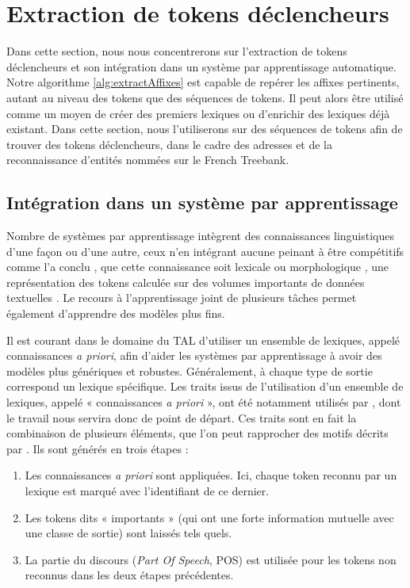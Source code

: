 \documentclass[12pt,a4paper,times,twoside,openright]{report}
\begin{document}
    
    \section{Extraction de tokens déclencheurs}
    \label{sec:keyword-extraction}
Dans cette section, nous nous concentrerons sur l'extraction de tokens déclencheurs et son intégration dans un système par apprentissage automatique. Notre algorithme \ref{alg:extractAffixes} est capable de repérer les affixes pertinents, autant au niveau des tokens que des séquences de tokens. Il peut alors être utilisé comme un moyen de créer des premiers lexiques ou d'enrichir des lexiques déjà existant. Dans cette section, nous l'utiliserons sur des séquences de tokens afin de trouver des tokens déclencheurs, dans le cadre des adresses et de la reconnaissance d'entités nommées sur le French Treebank.



        \subsection{Intégration dans un système par apprentissage}
        \label{subsec:ontology-integration}
Nombre de systèmes par apprentissage intègrent des connaissances linguistiques d'une façon ou d'une autre, ceux n'en intégrant aucune peinant à être compétitifs comme l'a conclu \citet{jungermann2007named}, que cette connaissance soit lexicale ou morphologique \citep{raymond2010reconnaissance,constant2011integrer,holat2016fouille}, une représentation des tokens calculée sur des volumes importants de données textuelles \citep{collobert2008unified,ratinov2009design,lample2016neural}. Le recours à l'apprentissage joint de plusieurs tâches \citep{collobert2008unified,luo2015joint} permet également d'apprendre des modèles plus fins.

Il est courant dans le domaine du TAL d'utiliser un ensemble de lexiques, appelé connaissances \emph{a priori}, afin d'aider les systèmes par apprentissage à avoir des modèles plus génériques et robustes. Généralement, à chaque type de sortie correspond un lexique spécifique. Les traits issus de l'utilisation d'un ensemble de lexiques, appelé « connaissances \emph{a priori} », ont été notamment utilisés par \citet{raymond2010reconnaissance}, dont le travail nous servira donc de point de départ. Ces traits sont en fait la combinaison de plusieurs éléments, que l'on peut rapprocher des motifs décrits par \citet{holat2016fouille}. Ils sont générés en trois étapes :
\begin{enumerate}
    \item Les connaissances \emph{a priori} sont appliquées. Ici, chaque token reconnu par un lexique est marqué avec l'identifiant de ce dernier.
    \item Les tokens dits « importants » (qui ont une forte information mutuelle avec une classe de sortie) sont laissés tels quels.
    \item La partie du discours (\emph{Part Of Speech}, POS) est utilisée pour les tokens non reconnus dans les deux étapes précédentes.
\end{enumerate}
\end{document}

